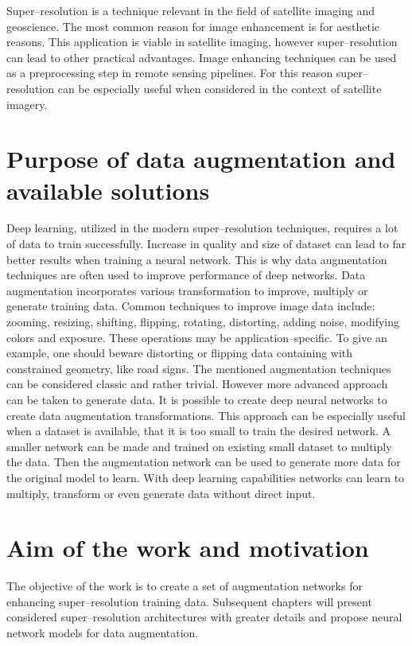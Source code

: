 Super--resolution is a technique relevant in the field of satellite imaging and
geoscience.
The most common reason for image enhancement is for aesthetic reasons.
This application is viable in satellite imaging, however super--resolution can
lead to other practical advantages.
Image enhancing techniques can be used as a preprocessing step in remote
sensing pipelines.
For this reason super--resolution can be especially useful when considered in
the context of satellite imagery.

\section{Purpose of data augmentation and available solutions}
Deep learning, utilized in the modern super--resolution techniques, requires a
lot of data to train successfully.
Increase in quality and size of dataset can lead to far better results when
training a neural network.
This is why data augmentation techniques are often used to improve performance
of deep networks.
Data augmentation incorporates various transformation to improve, multiply or
generate training data.
Common techniques to improve image data include: zooming, resizing, shifting,
flipping, rotating, distorting, adding noise, modifying colors and exposure.
These operations may be application--specific.
To give an example, one should beware distorting or flipping data containing
with constrained geometry, like road signs.
The mentioned augmentation techniques can be considered classic and rather
trivial.
However more advanced approach can be taken to generate data.
It is possible to create deep neural networks to create data augmentation
transformations.
This approach can be especially useful when a dataset is available, that it is
too small to train the desired network.
A smaller network can be made and trained on existing small dataset to multiply
the data.
Then the augmentation network can be used to generate more data for the
original model to learn.
With deep learning capabilities networks can learn to multiply, transform or
even generate data without direct input.

\section{Aim of the work and motivation}
The objective of the work is to create a set of augmentation networks for
enhancing super--resolution training data.
Subsequent chapters will present considered super--resolution architectures
with greater details and propose neural network models for data augmentation.

